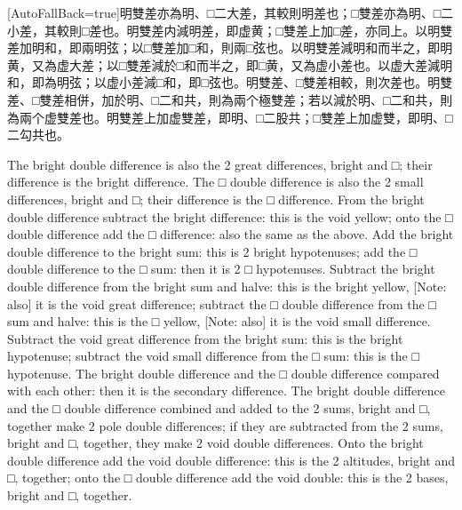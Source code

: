 \documentclass[11pt]{article}
\newcommand{\zhsmall}{\footnotesize\color{black!70}}
\newcommand{\unitlabel}[1]{\marginpar{\raggedleft\tiny\color{gray}#1}}
\newenvironment{unitzh}{\par\CJKfontspec{Noto Serif CJK SC}[AutoFallBack=true]\large\linespread{1.25}\selectfont}{\par}
\newenvironment{uniten}{\par\small\color{black!85}}{\par\medskip}
\begin{document}
\begin{unitzh}\unitlabel{ceyuan-004.20}明雙差亦為明、□二大差，其較則明差也；□雙差亦為明、□二小差，其較則□差也。明雙差内減明差，即虚黄；□雙差上加□差，亦同上。以明雙差加明和，即兩明弦；以□雙差加□和，則兩□弦也。以明雙差減明和而半之，即明黄，{\zhsmall 又}為虚大差；以□雙差減於□和而半之，即□黄，{\zhsmall 又}為虚小差也。以虚大差減明和，即為明弦；以虚小差減□和，即□弦也。明雙差、□雙差相較，則次差也。明雙差、□雙差相併，加於明、□二和共，則為兩个極雙差；若以減於明、□二和共，則為兩个虚雙差也。明雙差上加虚雙差，即明、□二股共；□雙差上加虚雙，即明、□二勾共也。\end{unitzh}
\begin{uniten}The bright double difference is also the 2 great differences, bright and □; their difference is the bright difference. The □ double difference is also the 2 small differences, bright and □; their difference is the □ difference. From the bright double difference subtract the bright difference: this is the void yellow; onto the □ double difference add the □ difference: also the same as the above. Add the bright double difference to the bright sum: this is 2 bright hypotenuses; add the □ double difference to the □ sum: then it is 2 □ hypotenuses. Subtract the bright double difference from the bright sum and halve: this is the bright yellow, [Note: also] it is the void great difference; subtract the □ double difference from the □ sum and halve: this is the □ yellow, [Note: also] it is the void small difference. Subtract the void great difference from the bright sum: this is the bright hypotenuse; subtract the void small difference from the □ sum: this is the □ hypotenuse. The bright double difference and the □ double difference compared with each other: then it is the secondary difference. The bright double difference and the □ double difference combined and added to the 2 sums, bright and □, together make 2 pole double differences; if they are subtracted from the 2 sums, bright and □, together, they make 2 void double differences. Onto the bright double difference add the void double difference: this is the 2 altitudes, bright and □, together; onto the □ double difference add the void double: this is the 2 bases, bright and □, together.\end{uniten}
\end{document}

